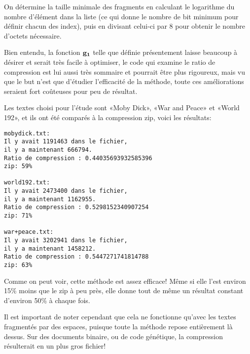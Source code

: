 \documentclass{article}
\newcommand{\key}[1]{{\bf #1}}
\begin{document}
On détermine la taille minimale des fragments en calculant le logarithme du nombre d'élément dans la liste (ce qui donne le nombre de bit minimum pour définir chacun des index), puis en divisant celui-ci par 8 pour obtenir le nombre d'octets nécessaire.

Bien entendu, la fonction $\key{g_1}$ telle que définie présentement laisse beaucoup à désirer et serait très facile à optimiser, le code qui examine le ratio de compression est lui aussi très sommaire et pourrait être plus rigoureux, mais vu que le but n'est que d'étudier l'efficacité de la méthode, toute ces améliorations seraient fort coûteuses pour peu de résultat.

Les textes choisi pour l'étude sont «Moby Dick», «War and Peace» et «World 192», et ils ont été comparés à la compression zip, voici les résultats:
\begin{verbatim}
mobydick.txt:
Il y avait 1191463 dans le fichier,
il y a maintenant 666794.
Ratio de compression : 0.44035693932585396
zip: 59%

world192.txt:
Il y avait 2473400 dans le fichier,
il y a maintenant 1162955.
Ratio de compression : 0.5298152340907254
zip: 71%

war+peace.txt:
Il y avait 3202941 dans le fichier,
il y a maintenant 1458212.
Ratio de compression : 0.5447271741814788
zip: 63%
\end{verbatim}
Comme on peut voir, cette méthode est assez efficace! Même si elle l'est environ 15\% moins que le zip à peu près, elle donne tout de même un résultat constant d'environ 50\% à chaque fois.

Il est important de noter cependant que cela ne fonctionne qu'avec les textes fragmentés par des espaces, puisque toute la méthode repose entièrement là dessus. Sur des documents binaire, ou de code génétique, la compression résulterait en un plus gros fichier!
\end{document}
